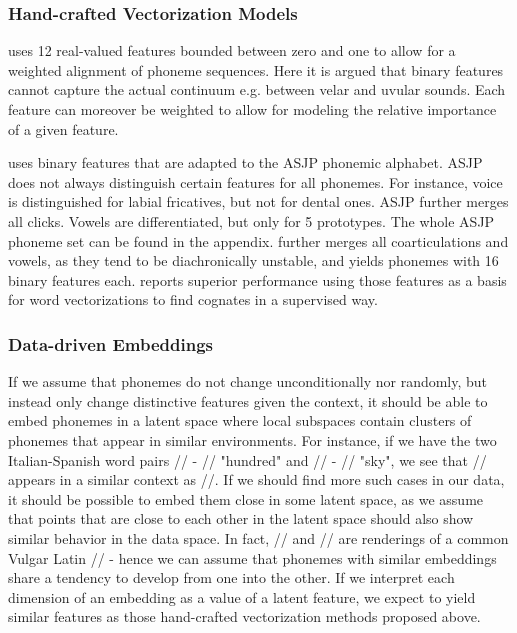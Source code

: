 \documentclass[6pt]{article}
\begin{document}
\subsubsection{Hand-crafted Vectorization Models}



\cite{kondrak2000new} uses 12 real-valued features bounded between zero and one to allow for a weighted alignment of phoneme sequences. Here it is argued that binary features cannot capture the actual continuum e.g. between velar and uvular sounds. Each feature can moreover be weighted to allow for modeling the relative importance of a given feature.


\cite{rama2016siamese} uses binary features that are adapted to the ASJP phonemic alphabet. ASJP does not always distinguish certain features for all phonemes. For instance, voice is distinguished for labial fricatives, but not for dental ones. ASJP further merges all clicks. Vowels are differentiated, but only for 5 prototypes. The whole ASJP phoneme set can be found in the appendix. \cite{rama2016siamese} further merges all coarticulations and vowels, as they tend to be diachronically unstable, and yields phonemes with 16 binary features each. \cite{rama2016siamese} reports superior performance using those features as a basis for word vectorizations to find cognates in a supervised way.
\subsubsection{Data-driven Embeddings}




If we assume that phonemes do not change unconditionally nor randomly, but instead only change distinctive features given the context, it should be able to embed phonemes in a latent space where local subspaces contain clusters of phonemes that appear in similar environments. For instance, if we have the two Italian-Spanish word pairs // - // "hundred" and  // - // "sky", we see that // appears in a similar context as //. If we should find more such cases in our data, it should be possible to embed them close in some latent space, as we assume that points that are close to each other in the latent space should also show similar behavior in the data space. In fact, // and // are renderings of a common Vulgar Latin // - hence we can assume that phonemes with similar embeddings share a tendency to develop from one into the other. If we interpret each dimension of an embedding as a value of a latent feature, we expect to yield similar features as those hand-crafted vectorization methods proposed above.
\end{document}
